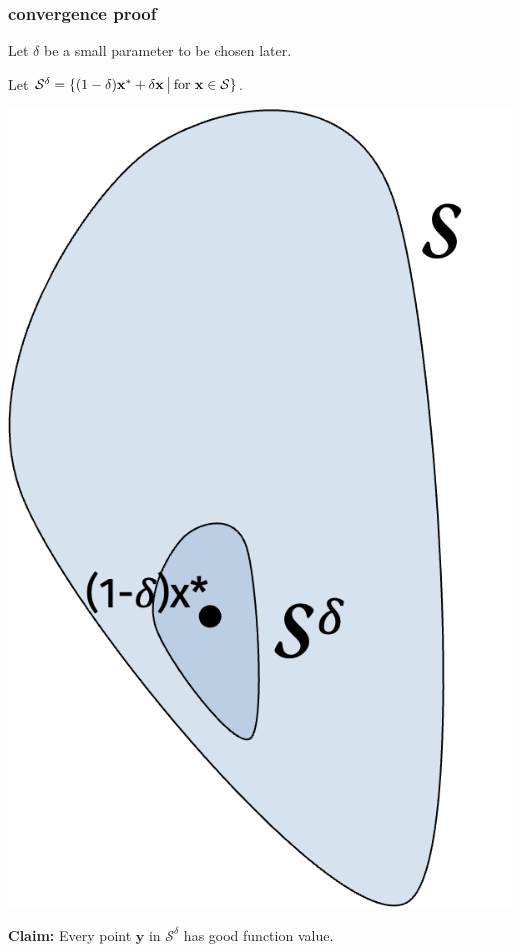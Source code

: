 \documentclass[compress]{beamer}
\newcommand{\bv}[1]{\mathbf{#1}}
\begin{document}
\begin{frame}
	\frametitle{convergence proof}
	Let $\delta$ be a small parameter to be chosen later. 
	
	Let $\mathcal{S}^{\delta} = \{(1-\delta)\bv{x}^* + \delta\bv{x} \hspace{.2em}\big\vert \hspace{.2em} \text{for } \bv{x}\in \mathcal{S} \}$.
	
	\begin{center}
	\includegraphics[width=.3\textwidth]{smallbody.png}
	\end{center}
	\textbf{Claim:} Every point $\bv{y}$ in $\mathcal{S}^{\delta}$ has good function value.
\end{frame}
\end{document}
